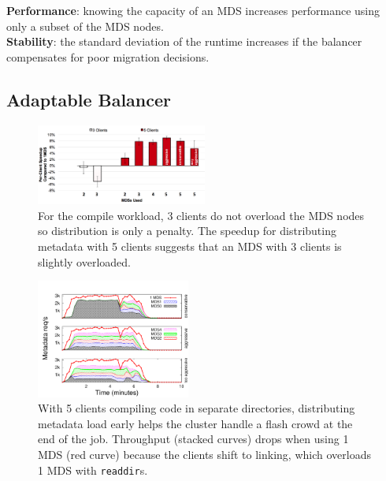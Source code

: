 \noindent\textbf{Performance}: knowing the capacity of an MDS increases performance using only a subset of the MDS nodes.\\
\noindent\textbf{Stability}: the standard deviation of the runtime increases if the balancer compensates for poor migration decisions.

\subsection{Adaptable Balancer}						%
\label{adaptable-balancer}								%
\begin{figure}[t]
	\centering	
	\includegraphics[width=0.5\textwidth]{./chapters/mantle/eval_spill-evenly_compile_bar}\caption{For the compile workload, 3 clients do not overload the MDS nodes so distribution is only a penalty. The speedup for distributing metadata with 5 clients suggests that an MDS with 3 clients is slightly overloaded.  \label{figure:eval_spill-evenly_compile_bar}}
\end{figure}
\begin{figure}[tb]
	\centering	
	\includegraphics[width=0.45\textwidth]{./chapters/mantle/eval_spill-evenly_compile}\caption{With 5 clients compiling code in separate directories, distributing metadata load early helps the cluster handle a flash crowd at the end of the job. Throughput (stacked curves) drops when using 1 MDS (red curve) because the clients shift to linking, which overloads 1 MDS with \texttt{readdir}s.\label{figure:eval_spill-evenly_compile}}
\end{figure}

